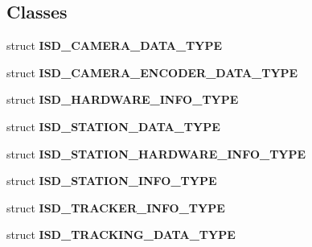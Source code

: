 \subsection*{\-Classes}
\begin{DoxyCompactItemize}
\item 
struct {\bf \-I\-S\-D\-\_\-\-C\-A\-M\-E\-R\-A\-\_\-\-D\-A\-T\-A\-\_\-\-T\-Y\-P\-E}
\item 
struct {\bf \-I\-S\-D\-\_\-\-C\-A\-M\-E\-R\-A\-\_\-\-E\-N\-C\-O\-D\-E\-R\-\_\-\-D\-A\-T\-A\-\_\-\-T\-Y\-P\-E}
\item 
struct {\bf \-I\-S\-D\-\_\-\-H\-A\-R\-D\-W\-A\-R\-E\-\_\-\-I\-N\-F\-O\-\_\-\-T\-Y\-P\-E}
\item 
struct {\bf \-I\-S\-D\-\_\-\-S\-T\-A\-T\-I\-O\-N\-\_\-\-D\-A\-T\-A\-\_\-\-T\-Y\-P\-E}
\item 
struct {\bf \-I\-S\-D\-\_\-\-S\-T\-A\-T\-I\-O\-N\-\_\-\-H\-A\-R\-D\-W\-A\-R\-E\-\_\-\-I\-N\-F\-O\-\_\-\-T\-Y\-P\-E}
\item 
struct {\bf \-I\-S\-D\-\_\-\-S\-T\-A\-T\-I\-O\-N\-\_\-\-I\-N\-F\-O\-\_\-\-T\-Y\-P\-E}
\item 
struct {\bf \-I\-S\-D\-\_\-\-T\-R\-A\-C\-K\-E\-R\-\_\-\-I\-N\-F\-O\-\_\-\-T\-Y\-P\-E}
\item 
struct {\bf \-I\-S\-D\-\_\-\-T\-R\-A\-C\-K\-I\-N\-G\-\_\-\-D\-A\-T\-A\-\_\-\-T\-Y\-P\-E}
\end{DoxyCompactItemize}
